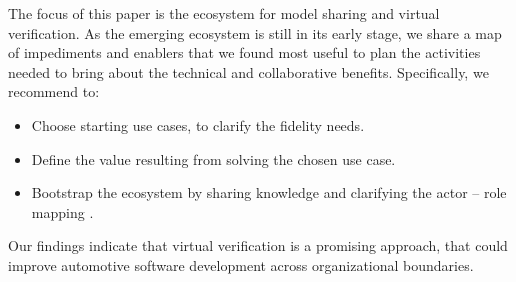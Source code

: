 The focus of this paper is 
the ecosystem for model sharing and virtual verification.
As the emerging ecosystem is still in its early stage,
we share a map of impediments and enablers that we found most useful to plan the activities needed to bring about the technical and collaborative benefits.
Specifically, we recommend to:
\begin{itemize}
    \item Choose starting use cases, to clarify the fidelity needs.
    \item Define the value resulting from solving the chosen use case.
    \item Bootstrap the ecosystem by sharing knowledge and clarifying the actor -- role mapping \cite{kilamo2012proprietary} .
\end{itemize}

Our findings indicate that virtual verification is a promising approach,
that could improve automotive software development across organizational boundaries.







